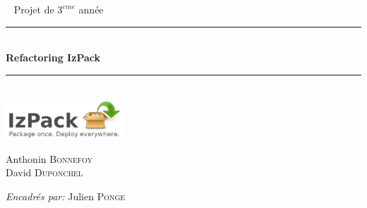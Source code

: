 \hspace{-0.15\textwidth}
\begin{frame}[plain]
\begin{center}
~
\vfill
\Large Projet de $3^{eme}$ année\\[1cm]
\hrule
~\\[0.4cm]
{ \Huge \bfseries Refactoring IzPack}\\[0.4cm]
\hrule
~\\[0.4cm]
\includegraphics[height=1.5cm]{../image/izpack-logo-big.png}
\\[0.4cm]
\vfill
\begin{minipage}{0.45\textwidth}
\begin{flushleft} %
\small
Anthonin \textsc{Bonnefoy}\\
David \textsc{Duponchel}\\
\end{flushleft}
\end{minipage}
\begin{minipage}{0.5\textwidth}
\begin{flushright}
\small
\emph{Encadrés par: }Julien \textsc{Ponge}\\
\end{flushright}
\end{minipage}\\[1cm]
\end{center}
\end{frame}